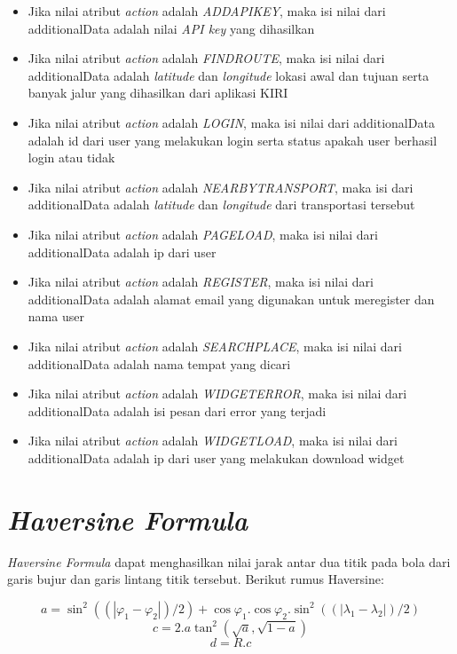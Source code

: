 \begin{itemize}
	\item Jika nilai atribut \textsl{action} adalah \textsl{ADDAPIKEY}, maka isi nilai dari additionalData adalah nilai \textsl{API key} yang dihasilkan
	\item Jika nilai atribut \textsl{action} adalah \textsl{FINDROUTE}, maka isi nilai dari additionalData adalah \textsl{latitude} dan \textsl{longitude} lokasi awal dan tujuan serta banyak jalur yang dihasilkan dari aplikasi KIRI
	\item Jika nilai atribut \textsl{action} adalah \textsl{LOGIN}, maka isi nilai dari additionalData adalah id dari user yang melakukan login serta status apakah user berhasil login atau tidak
	\item Jika nilai atribut \textsl{action} adalah \textsl{NEARBYTRANSPORT}, maka isi dari additionalData adalah \textsl{latitude} dan \textsl{longitude} dari transportasi tersebut
	\item Jika nilai atribut \textsl{action} adalah \textsl{PAGELOAD}, maka isi nilai dari additionalData adalah ip dari user
	\item Jika nilai atribut \textsl{action} adalah \textsl{REGISTER}, maka isi nilai dari additionalData adalah alamat email yang digunakan untuk meregister dan nama user
	\item Jika nilai atribut \textsl{action} adalah \textsl{SEARCHPLACE}, maka isi nilai dari additionalData adalah nama tempat yang dicari
	\item Jika nilai atribut \textsl{action} adalah \textsl{WIDGETERROR}, maka isi nilai dari additionalData adalah isi pesan dari error yang terjadi
	\item Jika nilai atribut \textsl{action} adalah \textsl{WIDGETLOAD}, maka isi nilai dari additionalData adalah ip dari user yang melakukan download widget
\end{itemize}

\section{\textsl{Haversine Formula}}\cite{Haversine}
\textsl{Haversine Formula} dapat menghasilkan nilai jarak antar dua titik pada bola dari garis bujur dan garis lintang titik tersebut. Berikut rumus Haversine:

\begin{displaymath}
	a = \sin^{2}((|\varphi_{1}-\varphi_{2}|)/2) + \cos\varphi_{1} . \cos\varphi_{2} . \sin^{2}((|\lambda_{1}-\lambda_{2}|)/2)
\end{displaymath}
\begin{displaymath}
	c = 2 . a\tan^{2}(\sqrt{a}, \sqrt{1-a})
\end{displaymath}
\begin{displaymath}
	d = R . c
\end{displaymath}

